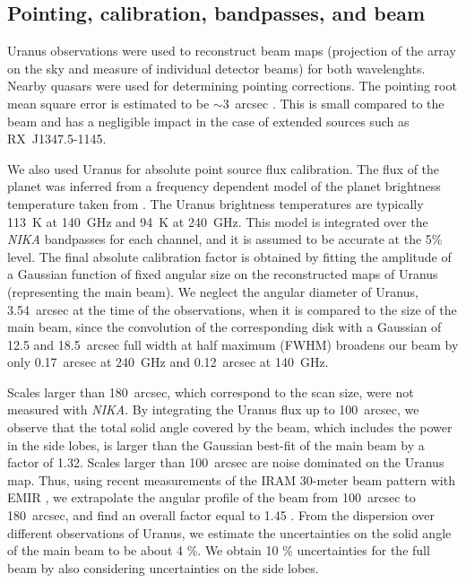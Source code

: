 \subsection{Pointing, calibration, bandpasses, and beam}
\label{sec:calib_pointing}
Uranus observations were used to reconstruct beam maps (projection of the array on the sky and measure of individual detector beams) for both wavelenghts. Nearby quasars were used for determining pointing corrections. The pointing root mean square error is estimated to be $\sim$3~arcsec \citep{main_run5}. This is small compared to the beam and has a negligible impact in the case of extended sources such as \mbox{RX~J1347.5-1145}.

We also used Uranus for absolute point source flux calibration. The flux of the planet was inferred from a frequency dependent model of the planet brightness temperature taken from \cite{moreno2010}. The Uranus brightness temperatures are typically 113~K at 140~GHz and 94~K at 240~GHz. This model is integrated over the {\it NIKA} bandpasses for each channel, and it is assumed to be accurate at the 5\% level. The final absolute calibration factor is obtained by fitting the amplitude of a Gaussian function of fixed angular size on the reconstructed maps of Uranus (representing the main beam). We neglect the angular diameter of Uranus, 3.54~arcsec at the time of the observations, when it is compared to the size of the main beam, since the convolution of the corresponding disk with a Gaussian of 12.5 and 18.5~arcsec full width at half maximum (FWHM) broadens our beam by only 0.17~arcsec at 240~GHz and 0.12~arcsec at 140~GHz.

Scales larger than 180~arcsec, which correspond to the scan size, were not measured with {\it NIKA}. By integrating the Uranus flux up to 100~arcsec, we observe that the total solid angle covered by the beam, which includes the power in the side lobes, is larger than the Gaussian best-fit of the main beam by a factor of 1.32. Scales larger than 100~arcsec are noise dominated on the Uranus map. Thus, using recent measurements of the IRAM 30-meter beam pattern with EMIR \citep{K13}, we extrapolate the angular profile of the beam from 100~arcsec to 180~arcsec, and find an overall factor equal to 1.45 \citep[see][for a more detailed description]{main_run5}. From the dispersion over different observations of Uranus, we estimate the uncertainties on the solid angle of the main beam to be about 4 \%.  We obtain 10 \% uncertainties for the full beam by also considering uncertainties on the side lobes. 

